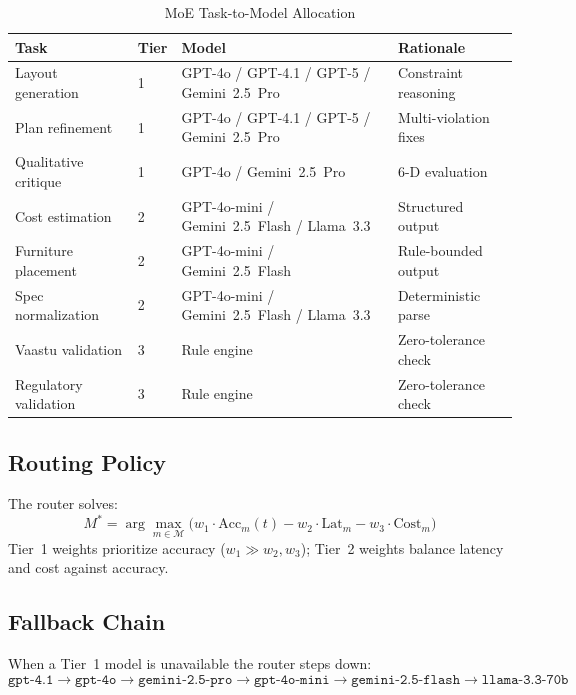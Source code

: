 \documentclass[journal]{IEEEtran}
\begin{document}
\begin{table}[t]
\centering
\caption{MoE Task-to-Model Allocation}
\label{tab:moe}
\scriptsize
\setlength{\tabcolsep}{5pt}
\renewcommand{\arraystretch}{1.15}
\begin{tabular}{p{2.6cm}lp{6.0cm}p{3.0cm}}
\toprule
\textbf{Task} & \textbf{Tier} & \textbf{Model} & \textbf{Rationale} \\
\midrule
Layout generation     & 1 & GPT-4o / GPT-4.1 / GPT-5 / Gemini~2.5~Pro   & Constraint reasoning \\
Plan refinement       & 1 & GPT-4o / GPT-4.1 / GPT-5 / Gemini~2.5~Pro   & Multi-violation fixes \\
Qualitative critique  & 1 & GPT-4o / Gemini~2.5~Pro                      & 6-D evaluation       \\
Cost estimation       & 2 & GPT-4o-mini / Gemini~2.5~Flash / Llama~3.3   & Structured output    \\
Furniture placement   & 2 & GPT-4o-mini / Gemini~2.5~Flash               & Rule-bounded output  \\
Spec normalization    & 2 & GPT-4o-mini / Gemini~2.5~Flash / Llama~3.3   & Deterministic parse  \\
Vaastu validation     & 3 & Rule engine                                  & Zero-tolerance check \\
Regulatory validation & 3 & Rule engine                                  & Zero-tolerance check \\
\bottomrule
\end{tabular}
\end{table}

\subsection{Routing Policy}

The router solves:
\begin{equation}
M^{*} = \arg\max_{m \in \mathcal{M}}
\bigl(w_1 \cdot \mathrm{Acc}_m(t) - w_2 \cdot \mathrm{Lat}_m
      - w_3 \cdot \mathrm{Cost}_m\bigr)
\label{eq:routing}
\end{equation}
Tier~1 weights prioritize accuracy ($w_1 \gg w_2, w_3$); Tier~2 weights
balance latency and cost against accuracy.

\subsection{Fallback Chain}

When a Tier~1 model is unavailable the router steps down:
\[
\texttt{gpt-4.1} \to \texttt{gpt-4o} \to \texttt{gemini-2.5-pro}
\to \texttt{gpt-4o-mini} \to \texttt{gemini-2.5-flash}
\to \texttt{llama-3.3-70b}
\]
\end{document}
